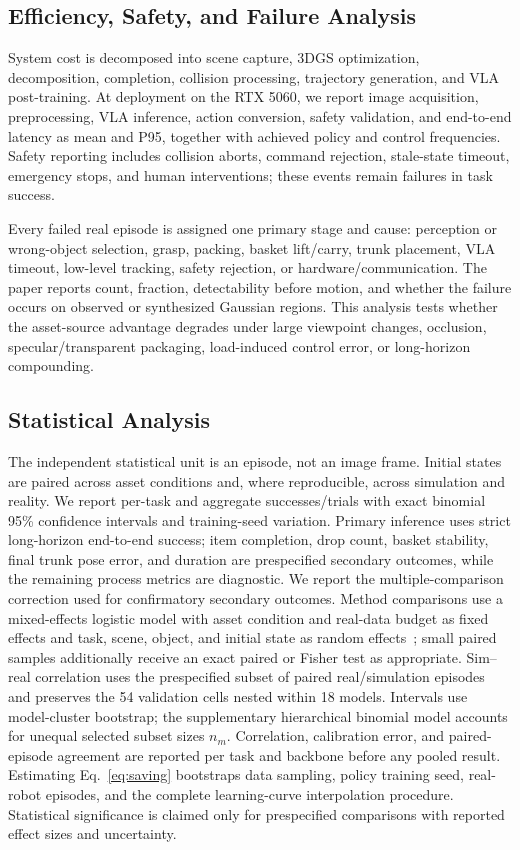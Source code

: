 \documentclass[letterpaper,10pt,conference]{ieeeconf}
\begin{document}
\subsection{Efficiency, Safety, and Failure Analysis}
System cost is decomposed into scene capture, 3DGS optimization, decomposition,
completion, collision processing, trajectory generation, and VLA post-training.
At deployment on the RTX 5060, we report image acquisition, preprocessing, VLA
inference, action conversion, safety validation, and end-to-end latency as mean and P95, together
with achieved policy and control frequencies. Safety reporting includes
collision aborts, command rejection, stale-state timeout, emergency stops, and
human interventions; these events remain failures in task success.

Every failed real episode is assigned one primary stage and cause: perception or
wrong-object selection, grasp, packing, basket lift/carry, trunk placement,
VLA timeout, low-level tracking, safety rejection, or hardware/communication.
The paper reports count, fraction, detectability before motion, and whether the
failure occurs on observed or synthesized Gaussian regions. This analysis tests
whether the asset-source advantage degrades under large viewpoint changes,
occlusion, specular/transparent packaging, load-induced control error, or
long-horizon compounding.

\subsection{Statistical Analysis}
The independent statistical unit is an episode, not an image frame. Initial
states are paired across asset conditions and, where reproducible, across
simulation and reality. We report per-task and aggregate successes/trials with
exact binomial 95\% confidence intervals and training-seed variation. Primary
inference uses strict long-horizon end-to-end success; item completion, drop
count, basket stability, final trunk pose error, and duration are prespecified
secondary outcomes, while the remaining process metrics are diagnostic. We
report the multiple-comparison correction used for confirmatory secondary
outcomes. Method comparisons use a mixed-effects logistic model with asset condition and real-data
budget as fixed effects and task, scene, object, and initial state as random
effects~\cite{kressgazit2024empirical}; small paired samples additionally receive
an exact paired or Fisher test as appropriate. Sim--real correlation uses the
prespecified subset of paired real/simulation episodes and preserves the 54
validation cells nested within 18 models. Intervals use model-cluster bootstrap;
the supplementary hierarchical binomial model accounts for unequal selected
subset sizes $n_m$. Correlation, calibration error, and paired-episode agreement
are reported per task and backbone before any pooled result.
Estimating
Eq.~\eqref{eq:saving} bootstraps data sampling, policy training seed, real-robot
episodes, and the complete learning-curve interpolation procedure. Statistical
significance is claimed only for prespecified comparisons with reported effect
sizes and uncertainty.
\end{document}
